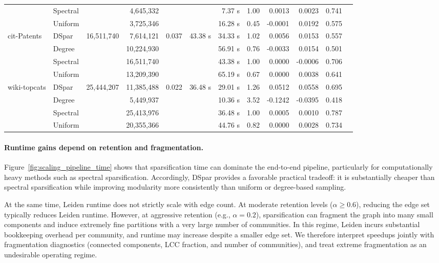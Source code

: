 \documentclass[10pt,journal,compsoc]{IEEEtran}
\begin{document}
\begin{table}[t]
\begin{tabular}{llrrrrrrrrrr}
 & Spectral &           & 4,645,332 &  &        & 7.37 s & 1.00 & 0.0013 & 0.0023 & 0.741 \\
 & Uniform  &           & 3,725,346 &  &        & 16.28 s & 0.45 & -0.0001 & 0.0192 & 0.575 \\
\midrule
cit-Patents\cite{leskovec2005graphs}
 & DSpar    & 16,511,740 & 7,614,121 & 0.037 & 43.38 s & 34.33 s & 1.02 & 0.0056 & 0.0153 & 0.557 \\
 & Degree   &            & 10,224,930 &  &        & 56.91 s & 0.76 & -0.0033 & 0.0154 & 0.501 \\
 & Spectral &            & 16,511,740 &  &        & 43.38 s & 1.00 & 0.0000 & -0.0006 & 0.706 \\
 & Uniform  &            & 13,209,390 &  &        & 65.19 s & 0.67 & 0.0000 & 0.0038 & 0.641 \\
\midrule
wiki-topcats\cite{yin2017local}
 & DSpar    & 25,444,207 & 11,385,488 & 0.022 & 36.48 s & 29.01 s & 1.26 & 0.0512 & 0.0558 & 0.695 \\
 & Degree   &            & 5,449,937  &  &         & 10.36 s & 3.52 & -0.1242 & -0.0395 & 0.418 \\
 & Spectral &            & 25,413,976 &  &         & 36.48 s & 1.00 & 0.0005 & 0.0010 & 0.787 \\
 & Uniform  &            & 20,355,366 &  &         & 44.76 s & 0.82 & 0.0000 & 0.0028 & 0.734 \\
\bottomrule
\end{tabular}
\end{table}


\paragraph{{Runtime gains depend on retention and fragmentation.}}

Figure~\ref{fig:scaling_pipeline_time} shows that sparsification time can dominate the end-to-end pipeline, particularly for computationally heavy methods such as spectral sparsification.
Accordingly, DSpar provides a favorable practical tradeoff: it is substantially cheaper than spectral sparsification while improving modularity more consistently than uniform or degree-based sampling.

At the same time, Leiden runtime does not strictly scale with edge count.
At moderate retention levels ($\alpha \ge 0.6$), reducing the edge set typically reduces Leiden runtime.
However, at aggressive retention (e.g., $\alpha=0.2$), sparsification can fragment the graph into many small components and induce extremely fine partitions with a very large number of communities.
In this regime, Leiden incurs substantial bookkeeping overhead per community, and runtime may increase despite a smaller edge set.
We therefore interpret speedups jointly with fragmentation diagnostics (connected components, LCC fraction, and number of communities), and treat extreme fragmentation as an undesirable operating regime.
\end{document}
